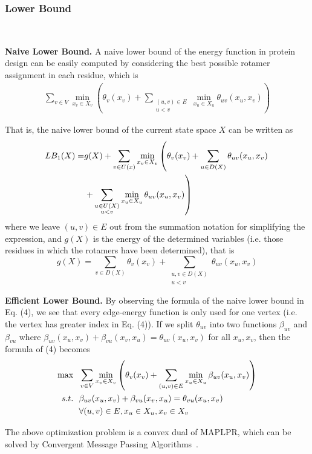 \subsubsection{Lower Bound}\

\noindent\textbf{Naive Lower Bound.}
A naive lower bound of the energy function in protein design can be easily computed by considering the best possible rotamer assignment in each residue, which is
\begin{align}
\sum_{v\in V}\min_{x_v\in X_v}\left(\theta_v(x_v)+\sum_{\substack{(u,v)\in E\\ u<v}}\min_{x_u\in X_u}\theta_{uv}(x_u,x_v)\right)
\end{align}

That is, the naive lower bound of the current state space $X$ can be written as
\begin{align}
LB_1(X)=&g(X)+\sum_{v\in U(x)}\min_{x_v\in X_v}\left(\theta_v(x_v)+\sum_{u\in D(X)}\theta_{uv}(x_u,x_v)\notag\right. \\
&\left.+\sum_{\substack{u\in U(X)\\ u<v}}\min_{x_u\in X_u}\theta_{uv}(x_u,x_v)\right)
\end{align}
where we leave $(u,v)\in E$ out from the summation notation for simplifying the expression, and $g(X)$ is the energy of the determined variables (i.e. those residues in which the rotamers have been determined), that is
\[
g(X) = \sum_{v\in D(X)}\theta_v(x_v)+\sum_{\substack{u,v\in D(X)\\ u<v}}\theta_{uv}(x_u,x_v)
\]

\noindent\textbf{Efficient Lower Bound.} By observing the formula of the naive lower bound in Eq. (4), we see that every edge-energy function is only used for one vertex (i.e. the vertex has greater index in Eq. (4)). If we split $\theta_{uv}$ into two functions $\beta_{uv}$ and $\beta_{vu}$ where $\beta_{uv}(x_u,x_v)+\beta_{vu}(x_v,x_u)=\theta_{uv}(x_u,x_v)$ for all $x_u,x_v$, then the formula of (4) becomes
\begin{align}
\max & \ \ \sum_{v\in V}\min_{x_v\in X_v}\left(\theta_v(x_v)+\sum_{(u,v)\in E}\min_{x_u\in X_u}\beta_{uv}(x_u,x_v)\right) \\
s.t. & \ \ \beta_{uv}(x_u,x_v)+\beta_{vu}(x_v,x_u)=\theta_{vu}(x_u,x_v) \notag \\
& \ \ \forall (u,v)\in E,x_u\in X_u,x_v\in X_v \notag
\end{align}

The above optimization problem is a convex dual of MAPLPR, which can be solved by Convergent Message Passing Algorithms~\cite[]{globerson2008fixing}.


